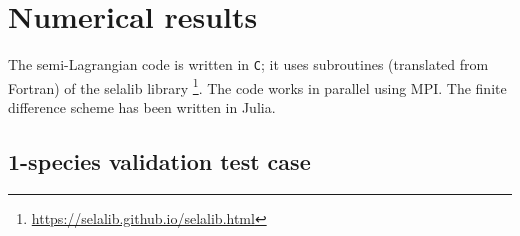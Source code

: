 \documentclass{article}
\numberwithin{equation}{section}
\newcommand{\todo}[1]{{\color{red}\textbf{#1}}}
\begin{document}
%
%

\section{Numerical results}

The semi-Lagrangian code is written in \texttt{C}; it uses subroutines (translated from Fortran) of the selalib library \footnote{\url{https://selalib.github.io/selalib.html}}. The code works in parallel using MPI.
The finite difference scheme has been written in Julia.

\subsection{1-species validation test case}
\end{document}
